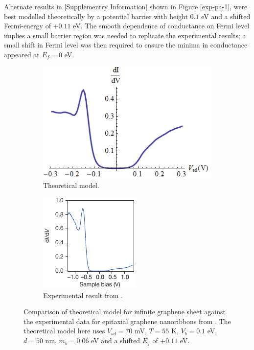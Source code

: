 		Alternate results in \cite{b19}[Supplementry Information] shown in Figure \ref{exp-pa-1}, were best modelled theoretically by a potential barrier with height $0.1$ eV and a shifted Fermi-energy of $+0.11$ eV. The smooth dependence of conductance on Fermi level implies a small barrier region was needed to replicate the experimental results; a small shift in Fermi level was then required to ensure the minima in conductance appeared at $E_{f}=0$ eV.

		\begin{figure}[h]
			\begin{subfigure}{0.45\textwidth}
				\centerline{\includegraphics[scale=0.5]{images/exp-a-2}}
				\caption{Theoretical model.}
			\end{subfigure}
			\hspace{1cm}
			\begin{subfigure}{0.45\textwidth}
				\centerline{\includegraphics[scale=0.8]{images/exp-pa-2}}
				\caption{Experimental result from \cite{b19}.}
			\end{subfigure}
			\caption{Comparison of theoretical model for infinite graphene sheet against the experimental data for epitaxial graphene nanoribbons from \cite{b19}. The theoretical model here uses $V_{sd}=70$ mV, $T=55$ K, $V_{b}=0.1$ eV, $d=50$ nm, $m_{b}=0.06$ eV and a shifted $E_{f}$ of $+0.11$ eV.}
			\label{exp-pa-2}
		\end{figure}

